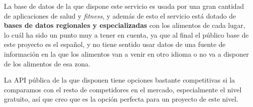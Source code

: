 La base de datos de la que dispone este servicio es usada por una gran cantidad de aplicaciones de salud y \textit{fitness}, y además de esto el servicio está dotado de \textbf{bases de datos regionales y especializadas} con los alimentos de cada lugar, lo cuál ha sido un punto muy a tener en cuenta, ya que al final el público base de este proyecto es el español, y no tiene sentido usar datos de una fuente de información en la que los alimentos van a venir en otro idioma o no va a disponer de los alimentos de esa zona.

La API pública de la que disponen tiene opciones bastante competitivas si la comparamos con el resto de competidores en el mercado, especialmente el nivel gratuito, así que creo que es la opción perfecta para un proyecto de este nivel.
